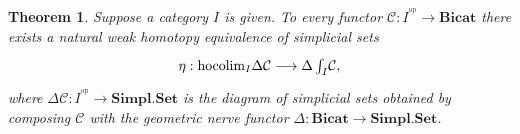 \documentclass[]{amsart}
\newtheorem{theorem}{Theorem}[section]
\begin{document}
\begin{theorem}\label{hct}
Suppose a category $I$ is given. To every functor ${\ensuremath{\mathcal{C}}}:I^{^{\mathrm{op}}}\to{\ensuremath{\mathbf{Bicat}}}$ there exists a
natural weak homotopy equivalence of simplicial sets
\begin{equation}\label{eta} \xymatrix{\eta: {\ensuremath{\mathrm{hocolim}}}_I{\ensuremath{\Delta}}{\ensuremath{\mathcal{C}}}\longrightarrow
{\ensuremath{\Delta}}\int_I\!{\ensuremath{\mathcal{C}}},}\end{equation}  where ${\ensuremath{\Delta}}{\ensuremath{\mathcal{C}}}:I^{^{\mathrm{op}}}\to{\ensuremath{\mathbf{Simpl.Set}}}$ is the diagram of
simplicial sets obtained by composing ${\ensuremath{\mathcal{C}}}$ with the geometric nerve functor ${\ensuremath{\Delta}}:{\ensuremath{\mathbf{Bicat}}}\to
{\ensuremath{\mathbf{Simpl.Set}}}$.
\end{theorem}
\end{document}
